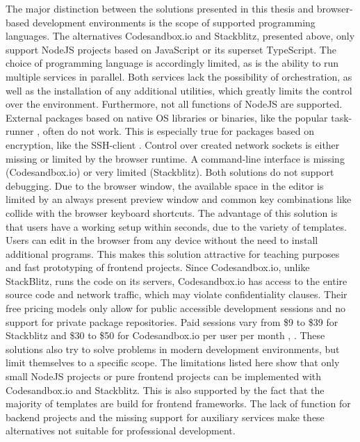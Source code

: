         The major distinction between the solutions presented in this thesis and browser-based development environments is the scope of supported programming languages. The alternatives Codesandbox.io and Stackblitz, presented above, only support NodeJS projects based on JavaScript or its superset TypeScript. The choice of programming language is accordingly limited, as is the ability to run multiple services in parallel. Both services lack the possibility of orchestration, as well as the installation of any additional utilities, which greatly limits the control over the environment. \newline
        Furthermore, not all functions of NodeJS are supported. External packages based on native \acl{OS} libraries or binaries, like the popular task-runner , often do not work. This is especially true for packages based on encryption, like the \ac{SSH}-client . Control over created network sockets is either missing or limited by the browser runtime. A command-line interface is missing (Codesandbox.io) or very limited (Stackblitz). Both solutions do not support debugging. Due to the browser window, the available space in the editor is limited by an always present preview window and common key combinations like  collide with the browser keyboard shortcuts.\newline
        The advantage of this solution is that users have a working setup within seconds, due to the variety of templates. Users can edit in the browser from any device without the need to install additional programs. This makes this solution attractive for teaching purposes and fast prototyping of frontend projects. Since Codesandbox.io, unlike StackBlitz, runs the code on its servers, Codesandbox.io has access to the entire source code and network traffic, which may violate confidentiality clauses. Their free pricing models only allow for public accessible development sessions and no support for private package repositories. Paid sessions vary from \$9 to \$39 for Stackblitz and \$30 to \$50 for Codesandbox.io per user per month \cite{stackblitz}, \cite{codesandbox}. \newline
        These solutions also try to solve problems in modern development environments, but limit themselves to a specific scope. The limitations listed here show that only small NodeJS projects or pure frontend projects can be implemented with Codesandbox.io and Stackblitz. This is also supported by the fact that the majority of templates are build for frontend frameworks. The lack of function for backend projects and the missing support for auxiliary services make these alternatives not suitable for professional development.

